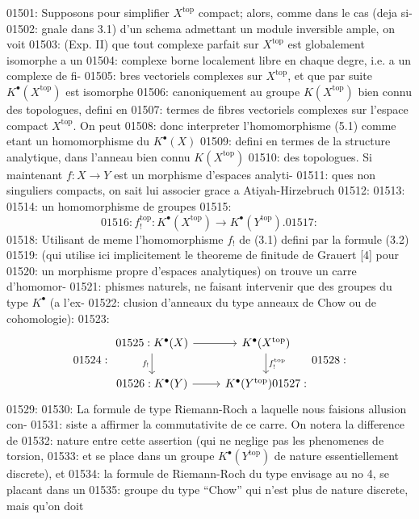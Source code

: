01501: Supposons pour simplifier $X^{\text{top}}$ compact; alors, comme dans le cas (deja si-
01502: gnale dans 3.1) d'un schema admettant un module inversible ample, on voit
01503: (Exp. II) que tout complexe parfait sur $X^{\text{top}}$ est globalement isomorphe a un
01504: complexe borne localement libre en chaque degre, i.e. a un complexe de fi-
01505: bres vectoriels complexes sur $X^{\text{top}}$, et que par suite $K^{\bullet}(X^{\text{top}})$ est isomorphe
01506: canoniquement au groupe $K(X^{\text{top}})$ bien connu des topologues, defini en
01507: termes de fibres vectoriels complexes sur l'espace compact $X^{\text{top}}$. On peut
01508: donc interpreter l'homomorphisme (5.1) comme etant un homomorphisme du $K^{\bullet}(X)$
01509: defini en termes de la structure analytique, dans l'anneau bien connu $K(X^{\text{top}})$
01510: des topologues. Si maintenant $f: X \to Y$ est un morphisme d'espaces analyti-
01511: ques non singuliers compacts, on sait lui associer grace a Atiyah-Hirzebruch
01512: 
01513: 
01514: un homomorphisme de groupes
01515: \begin{equation}
01516: f^{\text{top}}_{!}: K^{\bullet}(X^{\text{top}}) \longrightarrow K^{\bullet}(Y^{\text{top}}).
01517: \end{equation}
01518: Utilisant de meme l'homomorphisme $f_{!}$ de (3.1) defini par la formule (3.2)
01519: (qui utilise ici implicitement le theoreme de finitude de Grauert [4] pour
01520: un morphisme propre d'espaces analytiques) on trouve un carre d'homomor-
01521: phismes naturels, ne faisant intervenir que des groupes du type $K^{\bullet}$ (a l'ex-
01522: clusion d'anneaux du type anneaux de Chow ou de cohomologie):
01523: \begin{equation}
01524: \begin{tikzcd}
01525: K^{\bullet}(X) \arrow[r] \arrow[d, "f_{!}"'] & K^{\bullet}(X^{\text{top}}) \arrow[d, "f^{\text{top}}_{!}"] \\
01526: K^{\bullet}(Y) \arrow[r] & K^{\bullet}(Y^{\text{top}})
01527: \end{tikzcd}
01528: \end{equation}
01529: 
01530: La formule de type Riemann-Roch a laquelle nous faisions allusion con-
01531: siste a affirmer la commutativite de ce carre. On notera la difference de
01532: nature entre cette assertion (qui ne neglige pas les phenomenes de torsion,
01533: et se place dans un groupe $K^{\bullet}(Y^{\text{top}})$ de nature essentiellement discrete), et
01534: la formule de Riemann-Roch du type envisage au no 4, se placant dans un
01535: groupe du type ``Chow'' qui n'est plus de nature discrete, mais qu'on doit
